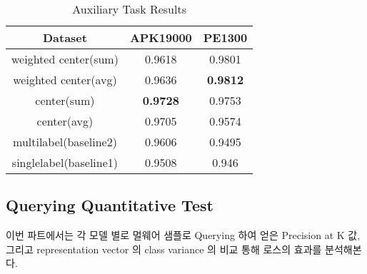 \begin{table}[!htb]%
\caption{Auxiliary Task Results}
\label{tab:auxiliary_result}
\begin{minipage}{\columnwidth}
\begin{center}
\begin{tabular}{|c|c|c|}
\hline
Dataset             & APK19000 & PE1300 \\ \hline
weighted center(sum)  & 0.9618   & 0.9801 \\ \hline
weighted center(avg) & 0.9636   & \textbf{0.9812} \\ \hline
center(sum)         & \textbf{0.9728 }  & 0.9753 \\ \hline
center(avg)        & 0.9705   & 0.9574 \\ \hline
multilabel(baseline2)          & 0.9606   & 0.9495 \\ \hline
singlelabel(baseline1)              & 0.9508   & 0.946  \\ \hline
\end{tabular}
\end{center}
\bigskip\centering
\end{minipage}
\end{table}%


\subsection{Querying Quantitative Test}

이번 파트에서는 각 모델 별로 멀웨어 샘플로 Querying 하여 얻은  Precision at K 값, 그리고 representation vector 의 class variance 의 비교 통해 로스의 효과를 분석해본다. 

